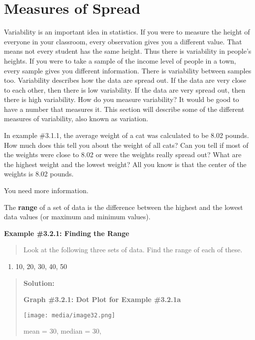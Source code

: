 \documentclass[]{book}
\providecommand{\tightlist}{%
  \setlength{\itemsep}{0pt}\setlength{\parskip}{0pt}}
\begin{document}
\hypertarget{measures-of-spread}{%
\section{Measures of Spread}\label{measures-of-spread}}

Variability is an important idea in statistics. If you were to measure the height of everyone in your classroom, every observation gives you a different value. That means not every student has the same height. Thus there is variability in people's heights. If you were to take a sample of the income level of people in a town, every sample gives you different information. There is variability between samples too. Variability describes how the data are spread out. If the data are very close to each other, then there is low variability. If the data are very spread out, then there is high variability. How do you measure variability? It would be good to have a number that measures it. This section will describe some of the different measures of variability, also known as variation.

In example \#3.1.1, the average weight of a cat was calculated to be 8.02 pounds. How much does this tell you about the weight of all cats? Can you tell if most of the weights were close to 8.02 or were the weights really spread out? What are the highest weight and the lowest weight? All you know is that the center of the weights is 8.02 pounds.

You need more information.

The \textbf{range} of a set of data is the difference between the highest and the lowest data values (or maximum and minimum values).

\textbf{Example \#3.2.1: Finding the Range}

\begin{quote}
Look at the following three sets of data. Find the range of each of
these.
\end{quote}

\begin{enumerate}
\def\labelenumi{\alph{enumi})}
\tightlist
\item
  10, 20, 30, 40, 50
\end{enumerate}

\begin{quote}
\textbf{Solution:}

\textbf{Graph \#3.2.1: Dot Plot for Example \#3.2.1a}

\texttt{[image: media/image32.png]}

mean = 30, median = 30,
\end{quote}
\end{document}
